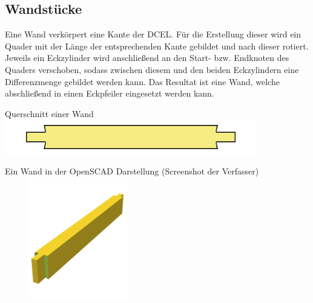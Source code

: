 \subsection{Wandstücke}
Eine Wand verkörpert eine Kante der DCEL.
Für die Erstellung dieser wird ein Quader mit der Länge der entsprechenden Kante gebildet und nach dieser rotiert.
Jeweils ein Eckzylinder wird anschließend an den Start- bzw. Endknoten des Quaders verschoben, sodass zwischen diesem und den beiden Eckzylindern eine Differenzmenge gebildet werden kann.
Das Resultat ist eine Wand, welche abschließend in einen Eckpfeiler eingesetzt werden kann. 
\begin{Bild}{Querschnitt einer Wand}
	\includegraphics[width = 110mm]{Bilder/Wand2D-04}
\end{Bild}
\begin{Bild}{Ein Wand in der OpenSCAD Darstellung (Screenshot der Verfasser)}
	\includegraphics[height=200px, width=240px]{Bilder/Untereinheit_Wand}
\end{Bild}

